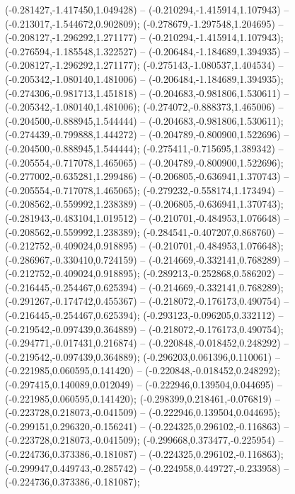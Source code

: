  (-0.281427,-1.417450,1.049428) -- (-0.210294,-1.415914,1.107943) -- (-0.213017,-1.544672,0.902809);
 (-0.278679,-1.297548,1.204695) -- (-0.208127,-1.296292,1.271177) -- (-0.210294,-1.415914,1.107943);
 (-0.276594,-1.185548,1.322527) -- (-0.206484,-1.184689,1.394935) -- (-0.208127,-1.296292,1.271177);
 (-0.275143,-1.080537,1.404534) -- (-0.205342,-1.080140,1.481006) -- (-0.206484,-1.184689,1.394935);
 (-0.274306,-0.981713,1.451818) -- (-0.204683,-0.981806,1.530611) -- (-0.205342,-1.080140,1.481006);
 (-0.274072,-0.888373,1.465006) -- (-0.204500,-0.888945,1.544444) -- (-0.204683,-0.981806,1.530611);
 (-0.274439,-0.799888,1.444272) -- (-0.204789,-0.800900,1.522696) -- (-0.204500,-0.888945,1.544444);
 (-0.275411,-0.715695,1.389342) -- (-0.205554,-0.717078,1.465065) -- (-0.204789,-0.800900,1.522696);
 (-0.277002,-0.635281,1.299486) -- (-0.206805,-0.636941,1.370743) -- (-0.205554,-0.717078,1.465065);
 (-0.279232,-0.558174,1.173494) -- (-0.208562,-0.559992,1.238389) -- (-0.206805,-0.636941,1.370743);
 (-0.281943,-0.483104,1.019512) -- (-0.210701,-0.484953,1.076648) -- (-0.208562,-0.559992,1.238389);
 (-0.284541,-0.407207,0.868760) -- (-0.212752,-0.409024,0.918895) -- (-0.210701,-0.484953,1.076648);
 (-0.286967,-0.330410,0.724159) -- (-0.214669,-0.332141,0.768289) -- (-0.212752,-0.409024,0.918895);
 (-0.289213,-0.252868,0.586202) -- (-0.216445,-0.254467,0.625394) -- (-0.214669,-0.332141,0.768289);
 (-0.291267,-0.174742,0.455367) -- (-0.218072,-0.176173,0.490754) -- (-0.216445,-0.254467,0.625394);
 (-0.293123,-0.096205,0.332112) -- (-0.219542,-0.097439,0.364889) -- (-0.218072,-0.176173,0.490754);
 (-0.294771,-0.017431,0.216874) -- (-0.220848,-0.018452,0.248292) -- (-0.219542,-0.097439,0.364889);
 (-0.296203,0.061396,0.110061) -- (-0.221985,0.060595,0.141420) -- (-0.220848,-0.018452,0.248292);
 (-0.297415,0.140089,0.012049) -- (-0.222946,0.139504,0.044695) -- (-0.221985,0.060595,0.141420);
 (-0.298399,0.218461,-0.076819) -- (-0.223728,0.218073,-0.041509) -- (-0.222946,0.139504,0.044695);
 (-0.299151,0.296320,-0.156241) -- (-0.224325,0.296102,-0.116863) -- (-0.223728,0.218073,-0.041509);
 (-0.299668,0.373477,-0.225954) -- (-0.224736,0.373386,-0.181087) -- (-0.224325,0.296102,-0.116863);
 (-0.299947,0.449743,-0.285742) -- (-0.224958,0.449727,-0.233958) -- (-0.224736,0.373386,-0.181087);
